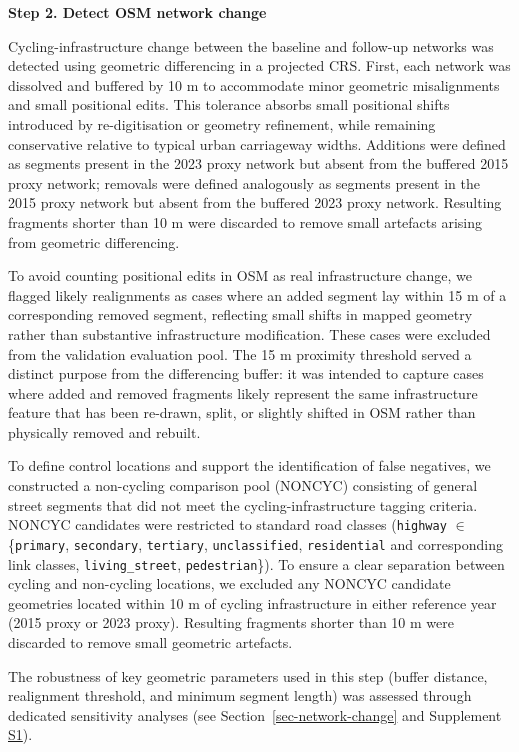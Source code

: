 \documentclass[
]{article}
\begin{document}
\textbf{Step 2. Detect OSM network change}

Cycling-infrastructure change between the baseline and follow-up
networks was detected using geometric differencing in a projected CRS.
First, each network was dissolved and buffered by 10 m to accommodate
minor geometric misalignments and small positional edits. This tolerance
absorbs small positional shifts introduced by re-digitisation or
geometry refinement, while remaining conservative relative to typical
urban carriageway widths. Additions were defined as segments present in
the 2023 proxy network but absent from the buffered 2015 proxy network;
removals were defined analogously as segments present in the 2015 proxy
network but absent from the buffered 2023 proxy network. Resulting
fragments shorter than 10 m were discarded to remove small artefacts
arising from geometric differencing.

To avoid counting positional edits in OSM as real infrastructure change,
we flagged likely realignments as cases where an added segment lay
within 15 m of a corresponding removed segment, reflecting small shifts
in mapped geometry rather than substantive infrastructure modification.
These cases were excluded from the validation evaluation pool. The 15 m
proximity threshold served a distinct purpose from the differencing
buffer: it was intended to capture cases where added and removed
fragments likely represent the same infrastructure feature that has been
re-drawn, split, or slightly shifted in OSM rather than physically
removed and rebuilt.

To define control locations and support the identification of false
negatives, we constructed a non-cycling comparison pool (NONCYC)
consisting of general street segments that did not meet the
cycling-infrastructure tagging criteria. NONCYC candidates were
restricted to standard road classes (\texttt{highway} \(\in\)
\{\texttt{primary}, \texttt{secondary}, \texttt{tertiary},
\texttt{unclassified}, \texttt{residential} and corresponding link
classes, \texttt{living\_street}, \texttt{pedestrian}\}). To ensure a
clear separation between cycling and non-cycling locations, we excluded
any NONCYC candidate geometries located within 10 m of cycling
infrastructure in either reference year (2015 proxy or 2023 proxy).
Resulting fragments shorter than 10 m were discarded to remove small
geometric artefacts.

\color{blue}The robustness of key geometric parameters used in this step
(buffer distance, realignment threshold, and minimum segment length) was
assessed through dedicated sensitivity analyses (see
Section~\ref{sec-network-change} and Supplement
\hyperref[s1-sensitivity]{S1}).\color{black}
\end{document}
